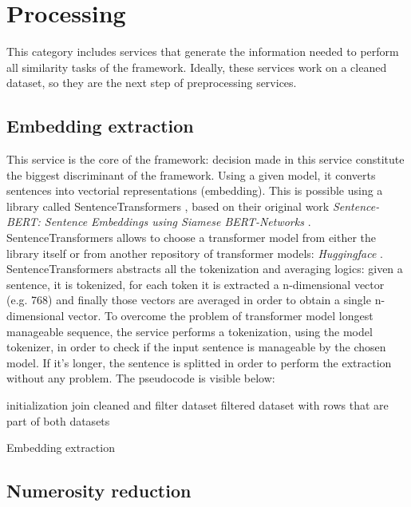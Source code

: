 \documentclass[\main/main.tex]{subfiles}
\begin{document}
\section{Processing}
This category includes services that generate the information needed to perform all similarity tasks of the framework. Ideally, these services work on a cleaned dataset, so they are the next step of preprocessing services. 
\subsection{Embedding extraction}
This service is the core of the framework: decision made in this service constitute the biggest discriminant of the framework. Using a given model, it converts sentences into vectorial representations (embedding). This is possible using a library called SentenceTransformers \cite{sbert}, based on their original work \textit{Sentence-BERT: Sentence Embeddings using Siamese BERT-Networks} \cite{reimers2019sentencebert}. SentenceTransformers allows to choose a transformer model from either the library itself or from another repository of transformer models: \textit{Huggingface} \cite{huggingface}. SentenceTransformers abstracts all the tokenization and averaging logics: given a sentence, it is tokenized, for each token it is extracted a n-dimensional vector (e.g. 768) and finally those vectors are averaged in order to obtain a single n-dimensional vector. To overcome the problem of transformer model longest manageable sequence, the service performs a tokenization, using the model tokenizer, in order to check if the input sentence is manageable by the chosen model. If it's longer, the sentence is splitted in order to perform the extraction without any problem. The pseudocode is visible below:
\begin{center}
    \begin{algorithm}[H]
     initialization
     join cleaned and filter dataset
     \Return filtered dataset with rows that are part of both datasets
     \caption{Embedding extraction}
    \end{algorithm}
\end{center}

\subsection{Numerosity reduction}
\end{document}
